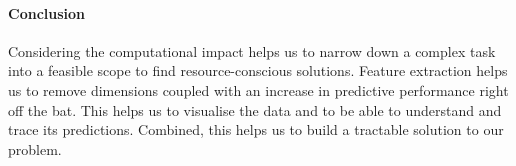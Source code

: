 

\paragraph{Conclusion}

Considering the computational impact helps us to narrow down a complex task into a feasible scope to find resource-conscious solutions.
Feature extraction helps us to remove dimensions coupled with an increase in predictive performance right off the bat.
This helps us to visualise the data and to be able to understand and trace its predictions.
Combined, this helps us to build a tractable solution to our problem.
